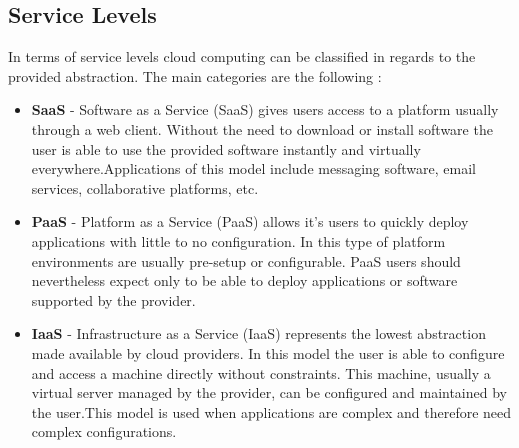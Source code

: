       \subsection{Service Levels} \label{chap:stateoftheheart:sec:cloud:sec:servicelevels}
  		In terms of service levels cloud computing can be classified in regards to the provided abstraction. The main categories are the following \cite{Vaquero2008} :
  		\begin{itemize}
  			\item \textbf{SaaS} - Software as a Service (SaaS) gives users access to a platform usually through a web client. Without the need to  download or install software the user is able to use the provided software instantly and virtually everywhere.\linebreak Applications of this model include messaging software, email services, collaborative platforms, etc.
 				\item \textbf{PaaS} - Platform as a Service (PaaS) allows it's users to quickly deploy applications with little to no configuration. In this type of platform environments are usually pre-setup or configurable. PaaS users should nevertheless expect only to be able to deploy applications or software supported by the provider.
  			\item \textbf{IaaS} - Infrastructure as a Service (IaaS) represents the lowest abstraction made available by cloud providers. In this model the user is able to configure and access a machine directly without constraints. This machine, usually a virtual server managed by the provider, can be configured and maintained by the user.\linebreak This model is used when applications are complex and therefore need complex configurations.
  		\end{itemize}

